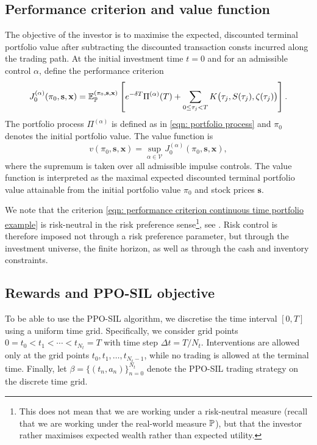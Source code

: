 \subsection{Performance criterion and value function}
The objective of the investor is to maximise the expected, discounted terminal portfolio value after subtracting the discounted transaction consts incurred along the trading path. At the initial investment time $t=0$ and for an admissible control $\alpha$, define the performance criterion
\begin{equation}
    J_0^{(\alpha)}(\pi_0, \mathbf s, \mathbf x) = \mathbb{E}_{\mathbb{P}}^{(\pi_0, \mathbf s, \mathbf x)} \left[e^{-\delta T} \Pi^{(\alpha)}(T) + \sum_{0 \leq \tau_j < T} K\big(\tau_j, S(\tau_j), \zeta(\tau_j)\big) \right]. 
    \label{eqn: performance criterion continuous time portfolio example}
\end{equation}
The portfolio process $\Pi^{(\alpha)}$ is defined as in \eqref{eqn: portfolio process} and $\pi_0$ denotes the initial portfolio value. The value function is 
\begin{equation*}
    v(\pi_0, \mathbf{s}, \mathbf x) = \sup_{\alpha \in \mathcal V} J_0^{(\alpha)}(\pi_0, \mathbf s, \mathbf x),
\end{equation*}
where the supremum is taken over all admissible impulse controls. The value function is interpreted as the maximal expected discounted terminal portfolio value attainable from the initial portfolio value $\pi_0$ and stock prices $\mathbf s$. 

We note that the criterion \eqref{eqn: performance criterion continuous time portfolio example} is risk-neutral in the risk preference sense\footnote{This does not mean that we are working under a risk-neutral measure (recall that we are working under the real-world measure $\mathbb{P}$), but that the investor rather maximises expected wealth rather than expected utility.}, see \cite{buehler2022deep}. Risk control is therefore imposed not through a risk preference parameter, but through the investment universe, the finite horizon, as well as through the cash and inventory constraints.

\subsection{Rewards and PPO-SIL objective}
To be able to use the PPO-SIL algorithm, we discretise the time interval $[0,T]$ using a uniform time grid. Specifically, we consider grid points $0=t_0 < t_1 < \cdots < t_{N_t}=T$ with time step $\Delta t = T/N_t$. Interventions are allowed only at the grid points $t_0, t_1, \ldots, t_{N_t-1}$, while no trading is allowed at the terminal time. Finally, let $\beta=\{(t_n, a_n)\}_{n=0}^{N_t}$ denote the PPO-SIL trading strategy on the discrete time grid.

